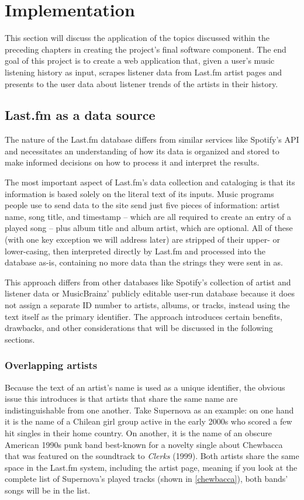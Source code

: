 \chapter{Implementation}\label{implement}

This section will discuss the application of the topics discussed within the preceding chapters in creating the project's final software component. The end goal of this project is to create a web application that, given a user's music listening history as input, scrapes listener data from Last.fm artist pages and presents to the user data about listener trends of the artists in their history. 

\section{Last.fm as a data source}

The nature of the Last.fm database differs from similar services like Spotify's API and necessitates an understanding of how its data is organized and stored to make informed decisions on how to process it and interpret the results.

The most important aspect of Last.fm's data collection and cataloging is that its information is based solely on the literal text of its inputs. Music programs people use to send data to the site send just five pieces of information: artist name, song title, and timestamp -- which are all required to create an entry of a played song -- plus album title and album artist, which are optional. All of these (with one key exception we will address later) are stripped of their upper- or lower-casing, then interpreted directly by Last.fm and processed into the database as-is, containing no more data than the strings they were sent in as.

This approach differs from other databases like Spotify's collection of artist and listener data or MusicBrainz' publicly editable user-run database because it does not assign a separate ID number to artists, albums, or tracks, instead using the text itself as the primary identifier. The approach introduces certain benefits, drawbacks, and other considerations that will be discussed in the following sections.

\subsection{Overlapping artists}

Because the text of an artist's name is used as a unique identifier, the obvious issue this introduces is that artists that share the same name are indistinguishable from one another. Take Supernova as an example: on one hand it is the name of a Chilean girl group active in the early 2000s who scored a few hit singles in their home country. On another, it is the name of an obscure American 1990s punk band best-known for a novelty single about Chewbacca that was featured on the soundtrack to \textit{Clerks} (1999). Both artists share the same space in the Last.fm system, including the artist page, meaning if you look at the complete list of Supernova's played tracks (shown in \autoref{chewbacca}), both bands' songs will be in the list.

